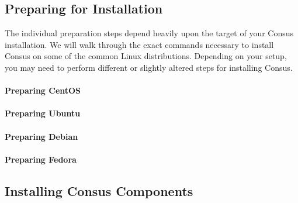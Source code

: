 \subsection{Preparing for Installation}

The individual preparation steps depend heavily upon the target of your Consus
installation.  We will walk through the exact commands necessary to install
Consus on some of the common Linux distributions.  Depending on your setup, you
may need to perform different or slightly altered steps for installing Consus.

\paragraph{Preparing CentOS}
\lipsum[4]

\paragraph{Preparing Ubuntu}
\lipsum[4]

\paragraph{Preparing Debian}
\lipsum[4]

\paragraph{Preparing Fedora}
\lipsum[4]

\subsection{Installing Consus Components}

\lipsum[4]


\lipsum[4]
